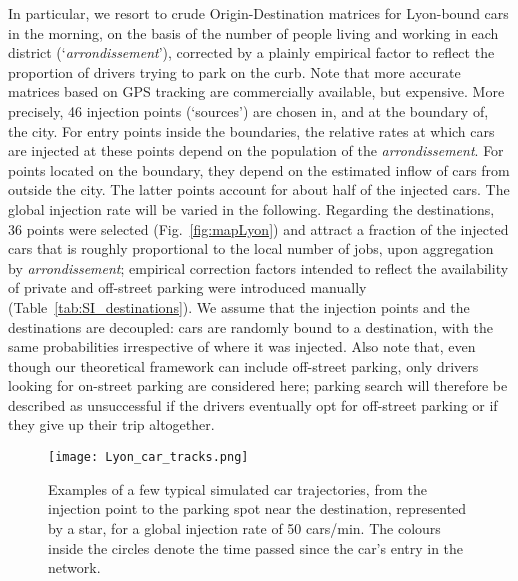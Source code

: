 \documentclass[trsc,reprint]{informs3}
\newcommand{\AN}[1]{#1}
\begin{document}
In particular, we resort to crude Origin-Destination matrices for Lyon-bound cars in the morning, on the basis of the number of people living and working in each district (`\emph{arrondissement}'), corrected by a plainly empirical factor to reflect the proportion of drivers trying to park on the curb. Note that more accurate matrices based on GPS tracking are commercially available, but expensive. More precisely, 46 injection points (`sources') are chosen in, and at the boundary of, the city. For entry points inside the boundaries, the relative rates at which cars are injected at these points
depend on the population of the \emph{arrondissement}. For points located on the boundary, they depend on the estimated inflow of cars from outside the city. The latter points account for about half of the injected cars. The global injection rate
will be varied in the following. Regarding the destinations, 36 points
were selected (Fig.~\ref{fig:mapLyon}) and attract a fraction of the injected cars that is
roughly proportional to the local number of jobs, upon aggregation \AN{by} \emph{arrondissement}; empirical correction factors intended to reflect the availability of private and off-street parking were introduced manually (Table~\ref{tab:SI_destinations}). We assume \AN{that the injection points and the destinations are decoupled}: cars are randomly bound to a destination, with the same probabilities irrespective of where it was injected. 
Also note that, even though our theoretical framework can include off-street parking, only drivers looking for on-street parking are considered here; parking search will therefore be described as unsuccessful if the drivers eventually opt for off-street parking or if they give up their trip altogether.



\begin{figure}[!ht]
    \centering
   \texttt{[image: Lyon\_car\_tracks.png]}
        \caption{Examples of a few typical simulated car trajectories, from the injection point
        to the parking spot near the destination, represented by a star, for a global injection rate of 50 cars/min. The colours inside the circles denote the time passed since the car's entry in the network. }
        \label{fig:cartracks}
\end{figure}
\end{document}
